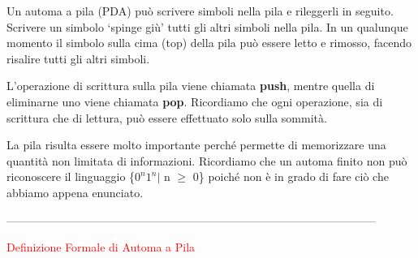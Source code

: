 \documentclass{article}
\begin{document}
\begin{center}

\end{center}

Un automa a pila (PDA) può scrivere simboli nella pila e rileggerli in seguito.
Scrivere un simbolo `spinge giù' tutti gli altri simboli nella pila. In un
qualunque momento il simbolo sulla cima (top) della pila può essere letto e
rimosso, facendo risalire tutti gli altri simboli. 

L'operazione di scrittura sulla pila viene chiamata \textbf{push}, mentre quella
di eliminarne uno viene chiamata \textbf{pop}. Ricordiamo che ogni operazione,
sia di scrittura che di lettura, può essere effettuato solo sulla sommità.

La pila risulta essere molto importante perché permette di memorizzare una
quantità non limitata di informazioni. Ricordiamo che un automa finito non può
riconoscere il linguaggio \{$0^n1^n | $ n $\geq$ 0\} poiché non è in grado di
fare ciò che abbiamo appena enunciato.

--------------------------------------------------------------------------------------------------

\begin{center}
    \textcolor{red}{Definizione Formale di Automa a Pila}
\end{center}
\end{document}
